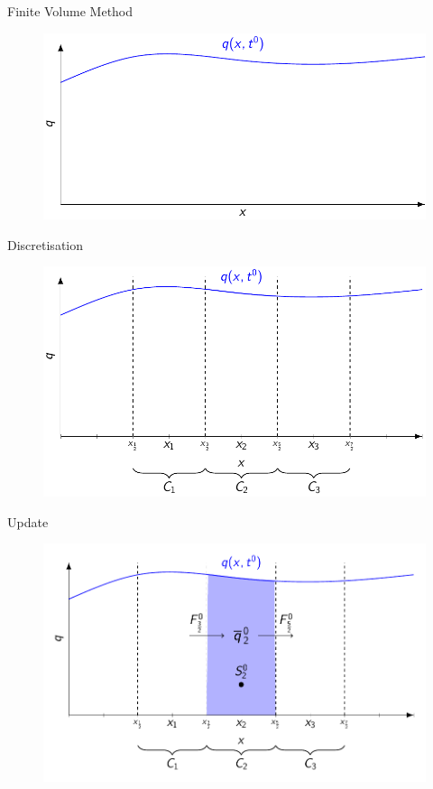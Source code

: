 \documentclass[pdf]{beamer}
\begin{document}
\begin{frame}{Finite Volume Method}
	\begin{figure}
		\includegraphics[width=\textwidth]{./Pics/Tex/FVM/Function.pdf}
	\end{figure}
\end{frame}

\begin{frame}{Discretisation}
	\begin{figure}
		\includegraphics[width=\textwidth]{./Pics/Tex/FVM/Cells.pdf}
	\end{figure}
\end{frame}

\begin{frame}{Update}
	\begin{figure}
		\includegraphics[width=\textwidth]{./Pics/Tex/FVM/TotalFluxInOutSource.pdf}
	\end{figure}
\end{frame}
\end{document}
